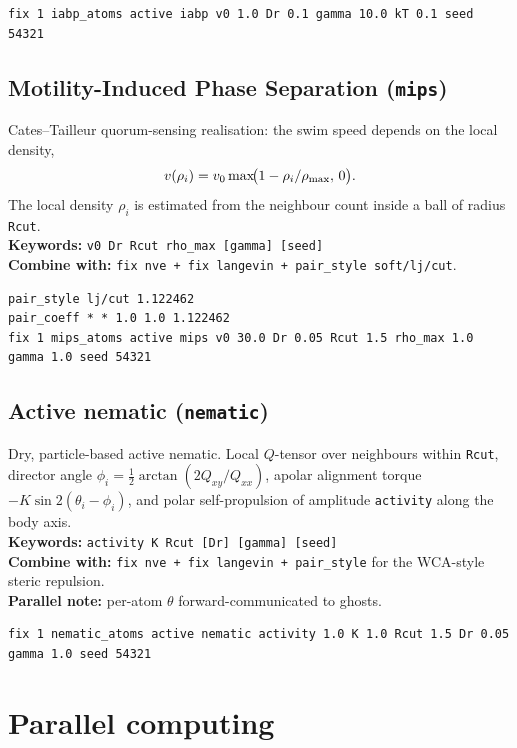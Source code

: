 \documentclass[11pt,a4paper]{article}
\begin{document}
\begin{lstlisting}
fix 1 iabp_atoms active iabp v0 1.0 Dr 0.1 gamma 10.0 kT 0.1 seed 54321
\end{lstlisting}

\subsection{Motility-Induced Phase Separation (\texttt{mips})}
Cates--Tailleur quorum-sensing realisation: the swim speed depends on the
local density,
\[
v(\rho_i)=v_0\max\!\bigl(1-\rho_i/\rho_{\rm max},\,0\bigr).
\]
The local density $\rho_i$ is estimated from the neighbour count inside a
ball of radius \texttt{Rcut}.\\
\textbf{Keywords:} \texttt{v0 Dr Rcut rho\_max [gamma] [seed]}\\
\textbf{Combine with:} \texttt{fix nve + fix langevin + pair\_style soft/lj/cut}.

\begin{lstlisting}
pair_style lj/cut 1.122462
pair_coeff * * 1.0 1.0 1.122462
fix 1 mips_atoms active mips v0 30.0 Dr 0.05 Rcut 1.5 rho_max 1.0 gamma 1.0 seed 54321
\end{lstlisting}

\subsection{Active nematic (\texttt{nematic})}
Dry, particle-based active nematic.  Local $Q$-tensor over neighbours
within \texttt{Rcut}, director angle
$\phi_i=\tfrac12\arctan(2Q_{xy}/Q_{xx})$, apolar alignment torque
$-K\sin 2(\theta_i-\phi_i)$, and polar self-propulsion of amplitude
\texttt{activity} along the body axis.\\
\textbf{Keywords:} \texttt{activity K Rcut [Dr] [gamma] [seed]}\\
\textbf{Combine with:} \texttt{fix nve + fix langevin + pair\_style} for the
WCA-style steric repulsion.\\
\textbf{Parallel note:} per-atom $\theta$ forward-communicated to ghosts.

\begin{lstlisting}
fix 1 nematic_atoms active nematic activity 1.0 K 1.0 Rcut 1.5 Dr 0.05 gamma 1.0 seed 54321
\end{lstlisting}

\section{Parallel computing}
\end{document}
